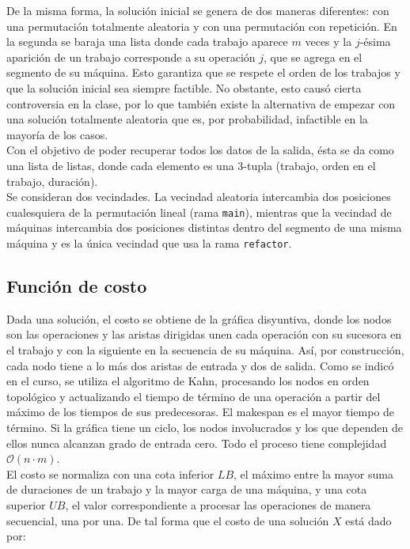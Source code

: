 \documentclass[9pt,a4paper,twocolumn,twoside]{rho-class/rho}
\begin{document}
De la misma forma, la solución inicial se genera de dos maneras diferentes: con una permutación totalmente aleatoria y con una permutación
con repetición. En la segunda se baraja una lista donde cada trabajo aparece $m$ veces y la $j$-ésima aparición de un trabajo corresponde a su
operación $j$, que se agrega en el segmento de su máquina. Esto garantiza que se respete el orden de los trabajos y que la solución
inicial sea siempre factible. No obstante, esto causó cierta controversia en la clase, por lo que también existe la alternativa de
empezar con una solución totalmente aleatoria que es, por probabilidad, infactible en la mayoría de los casos. \\
 
Con el objetivo de poder recuperar todos los datos de la salida, ésta se da como una lista de listas, donde cada elemento es una 3-tupla
(trabajo, orden en el trabajo, duración). \\

Se consideran dos vecindades. La vecindad aleatoria intercambia dos posiciones cualesquiera de la permutación lineal (rama \texttt{main}), 
mientras que la vecindad de máquinas intercambia dos posiciones distintas dentro del segmento de una misma máquina y es la única vecindad que
usa la rama \texttt{refactor}. \\

\subsection{Función de costo}
Dada una solución, el costo se obtiene de la gráfica disyuntiva, donde los nodos son las operaciones y las aristas dirigidas unen
cada operación con su sucesora en el trabajo y con la siguiente en la secuencia de su máquina. Así, por construcción, cada nodo tiene a
lo más dos aristas de entrada y dos de salida. Como se indicó en el curso, se utiliza el algoritmo de Kahn, procesando los nodos en orden
topológico y actualizando el tiempo de término de una operación a partir del máximo de los tiempos de sus predecesoras. El makespan
es el mayor tiempo de término. Si la gráfica tiene un ciclo, los nodos involucrados y los que dependen de ellos nunca alcanzan grado de
entrada cero. Todo el proceso tiene complejidad $\mathcal{O}(n \cdot m)$. \\
 
El costo se normaliza con una cota inferior $LB$, el máximo entre la mayor suma de duraciones de un trabajo y la mayor carga
de una máquina, y una cota superior $UB$, el valor correspondiente a procesar las operaciones de manera secuencial, una por una.
De tal forma que el costo de una solución $X$ está dado por:
 
\end{document}
